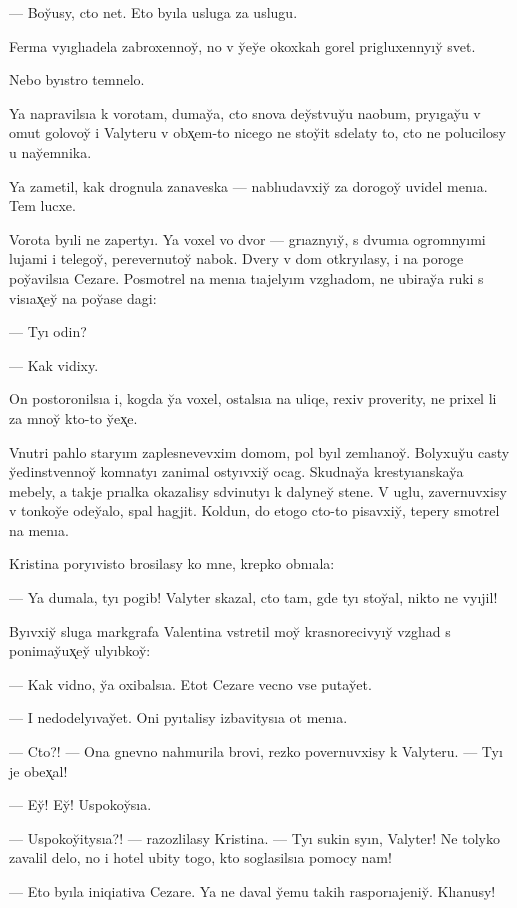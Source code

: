 \documentclass[10pt]{book}
\begin{document}
— Boy̆usy, cto net. Eto byıla usluga za uslugu.



Ferma vyıglıadela zabroxennoy̆, no v y̆ey̆e okoxkah gorel prigluxennyıy̆ svet.

Nebo byıstro temnelo.

Ya napravilsıa k vorotam, dumay̆a, cto snova dey̆stvuy̆u naobum, pryıgay̆u v omut golovoy̆ i Valyteru v obx̨em-to nicego ne stoy̆it sdelaty to, cto ne polucilosy u nay̆emnika.

Ya zametil, kak drognula zanaveska — nablıudavxiy̆ za dorogoy̆ uvidel menıa. Tem lucxe.

Vorota byıli ne zapertyı. Ya voxel vo dvor — grıaznyıy̆, s dvumıa ogromnyımi lujami i telegoy̆, perevernutoy̆ nabok. Dvery v dom otkryılasy, i na poroge poy̆avilsıa Cezare. Posmotrel na menıa tıajelyım vzglıadom, ne ubiray̆a ruki s visıax̨ey̆ na poy̆ase dagi:

— Tyı odin?

— Kak vidixy.

On postoronilsıa i, kogda y̆a voxel, ostalsıa na uliqe, rexiv proverity, ne prixel li za mnoy̆ kto-to y̆ex̨e.

Vnutri pahlo staryım zaplesnevevxim domom, pol byıl zemlıanoy̆. Bolyxuy̆u casty y̆edinstvennoy̆ komnatyı zanimal ostyıvxiy̆ ocag. Skudnay̆a krestyıanskay̆a mebely, a takje prıalka okazalisy sdvinutyı k dalyney̆ stene. V uglu, zavernuvxisy v tonkoy̆e odey̆alo, spal hagjit. Koldun, do etogo cto-to pisavxiy̆, tepery smotrel na menıa.

Kristina poryıvisto brosilasy ko mne, krepko obnıala:

— Ya dumala, tyı pogib! Valyter skazal, cto tam, gde tyı stoy̆al, nikto ne vyıjil!

Byıvxiy̆ sluga markgrafa Valentina vstretil moy̆ krasnorecivyıy̆ vzglıad s ponimay̆ux̨ey̆ ulyıbkoy̆:

— Kak vidno, y̆a oxibalsıa. Etot Cezare vecno vse putay̆et.

— I nedodelyıvay̆et. Oni pyıtalisy izbavitysıa ot menıa.

— Cto?! — Ona gnevno nahmurila brovi, rezko povernuvxisy k Valyteru. — Tyı je obex̨al!

— Ey̆! Ey̆! Uspokoy̆sıa.

— Uspokoy̆itysıa?! — razozlilasy Kristina. — Tyı sukin syın, Valyter! Ne tolyko zavalil delo, no i hotel ubity togo, kto soglasilsıa pomocy nam!

— Eto byıla iniqiativa Cezare. Ya ne daval y̆emu takih rasporıajeniy̆. Klıanusy!
\end{document}

